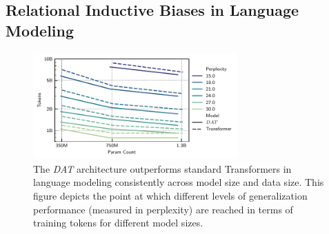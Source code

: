 

\subsection{Relational Inductive Biases in Language Modeling}\label{ssec:fineweb}

\begin{figure}[t]
    \centering
    \includegraphics[width=0.7\textwidth]{figs/experiments/fineweb/tokens_vs_param_count.pdf}
    \caption{The \textit{DAT} architecture outperforms standard Transformers in language modeling consistently across model size and data size. This figure depicts the point at which different levels of generalization performance (measured in perplexity) are reached in terms of training tokens for different model sizes. }\label{fig:fineweb_param_data}
\end{figure}

